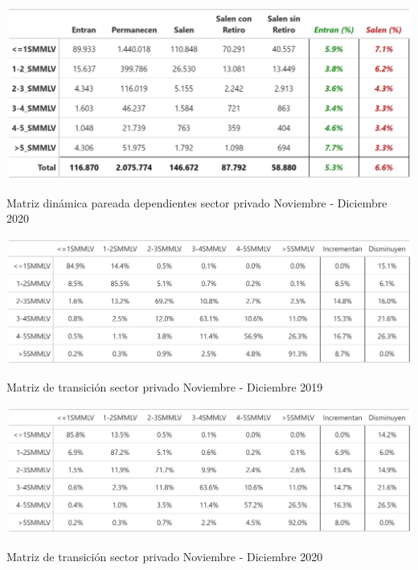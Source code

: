 \begin{table}[!h]
\label{tabla:sector_privado:matriz_dinamica_mes_12_2020}
\centering
\includegraphics[width = 15cm]{results/02_longitudinal/salida_resumen_dependientes_interes_20.png}
\caption{Matriz dinámica pareada dependientes sector privado Noviembre - Diciembre 2020}%
\end{table}

\begin{table}[!h]
\label{tabla:sector_privado:matriz_transicion_mes_11_12_2019}
\centering
\includegraphics[width = 15cm]{results/02_longitudinal/salida_matriz_transicion_dependientes_19.png}
\caption{Matriz de transición sector privado Noviembre - Diciembre 2019}%
\end{table}

\begin{table}[!h]
\label{tabla:sector_privado:matriz_transicion_mes_11_12_2020}
\centering
\includegraphics[width = 15cm]{results/02_longitudinal/salida_matriz_transicion_dependientes_20.png}
\caption{Matriz de transición sector privado Noviembre - Diciembre 2020}%
\end{table}



